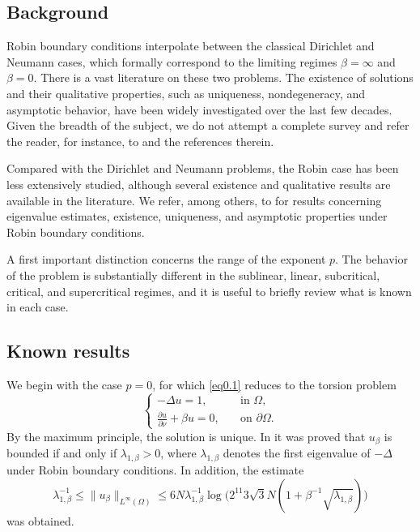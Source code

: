\documentclass[12pt,reqno]{amsart}
\numberwithin{equation}{section}
\theoremstyle{definition}
\begin{document}
\subsection{Background}

Robin boundary conditions interpolate between the classical Dirichlet and Neumann cases, which formally correspond to the limiting regimes $\beta=\infty$ and $\beta=0$. There is a vast literature on these two problems. The existence of solutions and their qualitative properties, such as uniqueness, nondegeneracy, and asymptotic behavior, have been widely investigated over the last few decades. Given the breadth of the subject, we do not attempt a complete survey and refer the reader, for instance, to \cite{BN,BO,GGP,GILY,GNN,GST,W,Z}  and the references therein.

Compared with the Dirichlet and Neumann problems, the Robin case has been less extensively studied, although several existence and qualitative results are available in the literature. We refer, among others, to \cite{D1,D2,BG,DF,FD,W,vB,GS} for results concerning eigenvalue estimates, existence, uniqueness, and asymptotic properties under Robin boundary conditions.

A first important distinction concerns the range of the exponent $p$. The behavior of the problem is substantially different in the sublinear, linear, subcritical, critical, and supercritical regimes, and it is useful to briefly review what is known in each case.

\subsection{Known results}

We begin with the case $p=0$, for which \eqref{eq0.1} reduces to the torsion problem
\begin{equation}\label{1.3}
\begin{cases}
-\Delta u=1,\quad &\text{in }\Omega,\\
\frac{\partial u}{\partial \nu}+\beta u=0,\quad &\text{on }\partial\Omega.
\end{cases}
\end{equation}
By the maximum principle, the solution is unique. In \cite{vB} it was proved that $u_\beta$ is bounded if and only if $\lambda_{1,\beta}>0$, where $\lambda_{1,\beta}$ denotes the first eigenvalue of $-\Delta$ under Robin boundary conditions. In addition, the estimate
\begin{equation}\label{1.4}
\lambda_{1,\beta}^{-1}\leq \|u_\beta\|_{L^\infty(\Omega)}\leq
6N\lambda_{1,\beta}^{-1}\log\bigl(2^{11}3\sqrt{3}N(1+\beta^{-1}\sqrt{\lambda_{1,\beta}})\bigr)
\end{equation}
was obtained.
\end{document}
